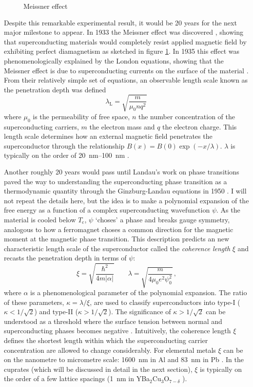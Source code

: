 \begin{figure}
    \centering
    \caption{Meissner effect}
    \label{fig:meissner}
\end{figure}

Despite this remarkable experimental result, it would be 20 years for the next major milestone to appear. In 1933 the Meissner effect was discovered \cite{Meissner1933}, showing that superconducting materials would completely resist applied magnetic field by exhibiting perfect diamagnetism as sketched in figure \ref{fig:meissner}. In 1935 this effect was phenomenologically explained by the London equations, showing that the Meissner effect is due to superconducting currents on the surface of the material \cite{London1935}. From their relatively simple set of equations, an observable length scale known as the penetration depth was defined
%
\[ \lambda_\text{L} = \sqrt{\frac{m}{\mu_0 n q^2}} \, \]
%
where $\mu_0$ is the permeability of free space, $n$ the number concentration of the superconducting carriers, $m$ the electron mass and $q$ the electron charge. This length scale determines how an external magnetic field penetrates the superconductor through the relationship $B(x) = B(0) \exp (-x / \lambda)$. $\lambda$ is typically on the order of \SIrange{20}{100}{\nano\meter} \cite{Kittel2005}.

Another roughly 20 years would pass until Landau's work on phase transitions paved the way to understanding the superconducting phase transition as a thermodynamic quantity through the Ginzburg-Landau equations in 1950 \cite{Ginzburg2009}. I will not repeat the details here, but the idea is to make a polynomial expansion of the free energy as a function of a complex superconducting wavefunction $\psi$. As the material is cooled below $T_\text{c}$, $\psi$ `choses' a phase and breaks gauge symmetry, analogous to how a ferromagnet choses a common direction for the magnetic moment at the magnetic phase transition. This description predicts an new characteristic length scale of the superconductor called the \emph{coherence length} $\xi$ and recasts the penetration depth in terms of $\psi$:
%
\[ \xi = \sqrt{\frac{\hbar^2}{4m|\alpha|}} \qquad \lambda = \sqrt{\frac{m}{4\mu_0 e^2 \psi_0^2 }} \, , \]
%
where $\alpha$ is a phenomenological parameter of the polynomial expansion. The ratio of these parameters, $\kappa = \lambda / \xi$, are used to classify superconductors into type-I ($\kappa < 1 / \sqrt{2}$) and type-II ($\kappa > 1 / \sqrt{2}$). The significance of $\kappa > 1 / \sqrt{2}$ can be understood as a threshold where the surface tension between normal and superconducting phases becomes negative \cite{Abrikosov1957}. Intuitively, the coherence length $\xi$ defines the shortest length within which the superconducting carrier concentration are allowed to change considerably. For elemental metals $\xi$ can be on the nanometre to micrometre scale: \SI{1600}{\nano\meter} in Al and \SI{83}{\nano\meter} in Pb \cite{Kittel2005}. In the cuprates (which will be discussed in detail in the next section), $\xi$ is typically on the order of a few lattice spacings (\SI{1}{\nano\meter} in YBa$_2$Cu$_3$O$_{7-\delta}$ \cite{Tomimoto1999}).

